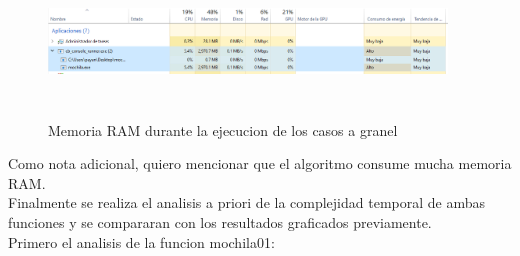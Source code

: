 \documentclass[spanish]{article}
\begin{document}
	\begin{figure}[H]
		\centering
		\includegraphics[width=400px,height=150px]{memoria}
		\caption{Memoria RAM durante la ejecucion de los casos a granel}
	\end{figure}
	Como nota adicional, quiero mencionar que el algoritmo consume mucha memoria RAM.\\ 		
	Finalmente se realiza el analisis a priori de la complejidad temporal de ambas funciones y se compararan con los resultados graficados previamente.\\
	Primero el analisis de la funcion mochila01:\\
\end{document}
